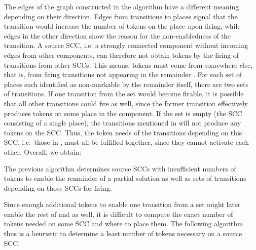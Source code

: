 \documentclass{LMCS}
\begin{document}
The edges of the graph  constructed in the algorithm have a different meaning depending on their direction.
Edges from transitions to places signal that the transition would increase the number of tokens on the place
upon firing, while edges in the other direction show the reason for the non-enabledness of the transition.
A source SCC, i.e. a strongly connected component without incoming edges from other components, can therefore
not obtain tokens by the firing of transitions from other SCCs. This means, tokens must come from somewhere else, 
that is, from firing transitions
not appearing in the remainder . For each set of places  such identified as non-markable by the remainder itself,
there are two sets of transitions. If one transition from the set  would become firable, it is possible that
all other transitions could fire as well, since the former transition effectively produces tokens on some place in
the component. If the set  is empty (the SCC consisting of a single place), the transitions mentioned in 
will not produce any tokens on the SCC. Thus, the token needs of the transitions depending on this SCC, i.e.\
those in , must all be fulfilled together, since they cannot activate each other. Overall, we obtain:
\begin{lem}\label{L.ALG1}
The previous algorithm determines source SCCs  with insufficient numbers of tokens to enable the
remainder  of a partial solution as well as sets  of transitions depending on those SCCs for firing.
\end{lem}

Since enough additional tokens to enable one transition from a set  might later enable the rest of  and
 as well, it is difficult to compute the exact number of tokens needed on some SCC and where to place them.
The following algorithm thus is a heuristic to determine a least number of tokens necessary on a source SCC.

\smallskip
\end{document}
